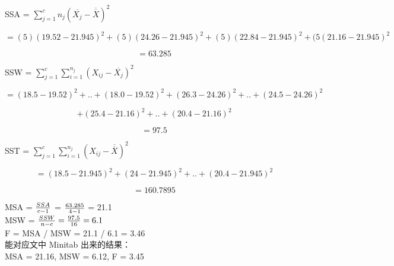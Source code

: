 SSA = \(\sum_{j=1}^c n_j(\overline{X_j} - \overline{\overline{X}})^2\)

\[= (5)(19.52 - 21.945)^2 + (5)(24.26 - 21.945)^2 + (5)(22.84 - 21.945)^2 + (5(21.16 - 21.945)^2\]

\[= 63.285\]

SSW = \(\sum_{j=1}^c \sum_{i=1}^{n_j} (X_{ij} - \overline{X_j})^2\)

\[=(18.5 - 19.52)^2 + . . + (18.0 - 19.52)^2 + (26.3 - 24.26)^2 + . . + (24.5 - 24.26)^2\]

\[+(25.4 - 21.16)^2 + . . + (20.4 - 21.16)^2\]

\[= 97.5\]

SST =
\(\sum_{j=1}^c \sum_{i=1}^{n_j} (X_{ij} - \overline{\overline{X}})^2\)

\[= (18.5 - 21.945)^2 + (24 - 21.945)^2 + ..+ (20.4 - 21.945)^2\]

\[= 160.7895\]

MSA = \({SSA \over c-1}\) = \({63.285 \over 4-1}\) = 21.1\\

MSW = \({SSW \over n -c} = {97.5 \over 16}= 6.1\)\\

F = MSA / MSW = 21.1 / 6.1 = 3.46\\

能对应文中 Minitab 出来的结果：\\

MSA = 21.16, MSW = 6.12, F = 3.45\\



